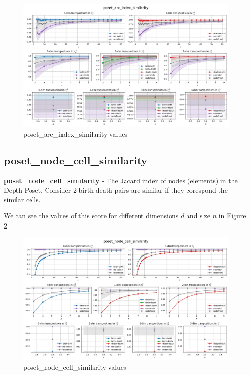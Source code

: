 \documentclass{article}
\begin{document}
\begin{figure}[h!]
    \centering
    \includegraphics[width=1.3\textwidth]{pics/torus-transpositions/similaritites/score=poset-arc-index-similarity.png}
    \caption{poset\_arc\_index\_similarity values}
    \label{fig:poset-arc-index-similarity}
\end{figure}

\subsection{poset\_node\_cell\_similarity}
\par \textbf{poset\_node\_cell\_similarity} - The Jacard index of nodes (elements) in the Depth Poset.
    Consider 2 birth-death pairs are similar if they corespond the similar cells.
\par We can see the values of this score for different dimensions $d$ and size $n$ in Figure \ref{fig:poset-node-cell-similarity}

\begin{figure}[h!]
    \centering
    \includegraphics[width=1.3\textwidth]{pics/torus-transpositions/similaritites/score=poset-node-cell-similarity.png}
    \caption{poset\_node\_cell\_similarity values}
    \label{fig:poset-node-cell-similarity}
\end{figure}
\end{document}
